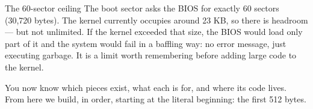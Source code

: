 \begin{center}
\end{center}

\begin{warn}{The 60-sector ceiling}
The boot sector asks the BIOS for exactly 60 sectors (30,720 bytes). The kernel currently occupies
around 23 KB, so there is headroom --- but not unlimited. If the kernel exceeded that size, the
BIOS would load only part of it and the system would fail in a baffling way: no error message,
just executing garbage. It is a limit worth remembering before adding large code to the kernel.
\end{warn}

\begin{summary}
You now know which pieces exist, what each is for, and where its code lives. From here we build, in
order, starting at the literal beginning: the first 512 bytes.
\end{summary}
